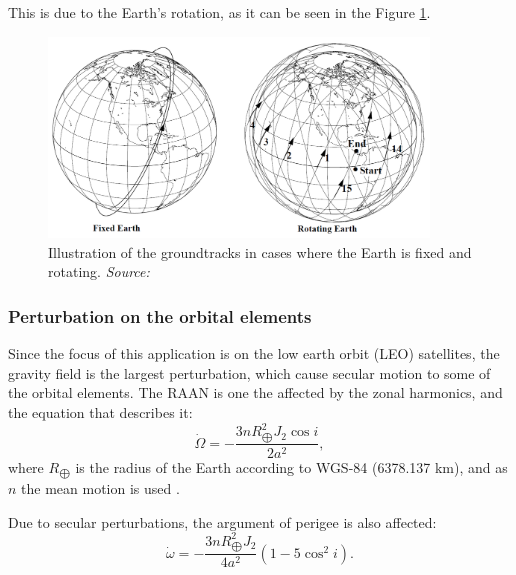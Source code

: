 This is due to the Earth's rotation, as it can be seen in the Figure \ref{groundtrack-fixed-rotating}.


\begin{figure}
\centering
\includegraphics[width=0.9\textwidth]{Images/groundtrack-fixed-rotating.png}\caption{Illustration of the groundtracks in cases where the Earth is fixed and rotating. \textit{Source: \cite{Vallado}}}
\label{groundtrack-fixed-rotating} 
\end{figure}


\bigskip
\subsubsection{Perturbation on the orbital elements}
\bigskip

Since the focus of this application is on the low earth orbit (LEO) satellites, the gravity field is the largest perturbation, which cause secular motion to some of the orbital elements. The RAAN is one the affected by the zonal harmonics, and the equation that describes it:
\begin{equation}
\dot{\Omega} = - \frac{3 n R_{\bigoplus}^{2} J_{2} \cos{i}}{2 a^{2}},
\end{equation}
where $R_{\bigoplus}$ is the radius of the Earth according to WGS-84 (6378.137 km), and as $n$ the mean motion is used \cite{Montenbruck}.

Due to secular perturbations, the argument of perigee is also affected:
\begin{equation}
\dot{\omega} = - \frac{3 n R_{\bigoplus}^{2} J_{2}}{4 a^{2}} (1 - 5 \cos^{2}{i}).
\end{equation}


